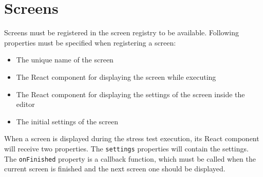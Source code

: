 \section{Screens}
\label{sec:screens}

Screens must be registered in the screen registry to be available.
Following properties must be specified when registering a screen:
\begin{itemize}
  \item The unique name of the screen
  \item The React component for displaying the screen while executing
  \item The React component for displaying the settings of the screen inside the editor
  \item The initial settings of the screen
\end{itemize}

When a screen is displayed during the stress test execution, its React component will receive two properties. 
The \texttt{settings} properties will contain the settings.
The \texttt{onFinished} property is a callback function, which must be called when the current screen is finished and the next screen one should be displayed.

